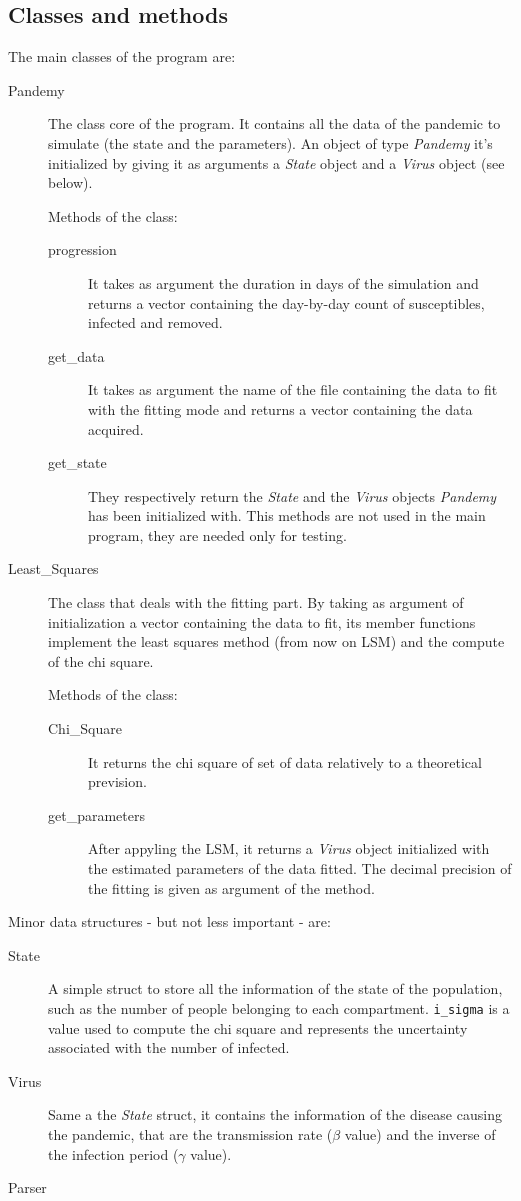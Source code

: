 \subsection{Classes and methods}

The main classes of the program are:
\begin{description}
\item[Pandemy] The class core of the program. It contains all the data of the pandemic to simulate (the state 
and the parameters). An object of type \emph{Pandemy} it's initialized by giving it as arguments a \emph{State} 
object and a \emph{Virus} object (see below).

Methods of the class:
\begin{description}
\item[progression] It takes as argument the duration in days of the simulation and returns a vector containing 
the day-by-day count of susceptibles, infected and removed.
\item[get\_data] It takes as argument the name of the file containing the data to fit with the fitting mode and 
returns a vector containing the data acquired.
\item[get\_state \and get\_virus] They respectively return the \emph{State} and the \emph{Virus} objects 
\emph{Pandemy} has been initialized with. This methods are not used in the main program, they are needed only 
for testing.
\end{description}

\item[Least\_Squares] The class that deals with the fitting part. By taking as argument of initialization a 
vector containing the data to fit, its member functions implement the least squares method (from now on LSM) and 
the compute of the chi square.

Methods of the class:
\begin{description}
\item[Chi\_Square] It returns the chi square of set of data relatively to a theoretical prevision.
\item[get\_parameters] After appyling the LSM, it returns a \emph{Virus} object initialized with the estimated 
parameters of the data fitted. The decimal precision of the fitting is given as argument of the method.
\end{description}

\end{description}

Minor data structures - but not less important - are:
\begin{description}
\item[State] A simple struct to store all the information of the state of the population, such as the number of 
people belonging to each compartment. \verb!i_sigma! is a value used to compute the chi square and represents 
the uncertainty associated with the number of infected.
\item[Virus] Same a the \emph{State} struct, it contains the information of the disease causing the pandemic, 
that are the transmission rate ($\beta$ value) and the inverse of the infection period ($\gamma$ value).
\item[Parser]
\end{description}


